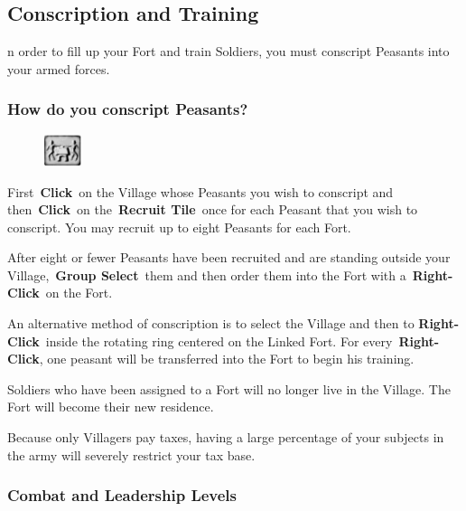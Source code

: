 \subsection{Conscription and Training}


n order to fill up your Fort and train Soldiers, you must conscript Peasants into your armed forces.

\subsubsection{How do you conscript Peasants?}

\begin{figure}
	\vspace{-20pt}
	\begin{center}
		\includegraphics[width=0.1\textwidth]{Trecruit}
	\end{center}
	\vspace{-20pt}
\end{figure}

First \textbf{Click} on the Village whose Peasants you wish to conscript and then \textbf{Click} on the \textbf{Recruit Tile} once for each Peasant that you wish to conscript. You may recruit up to eight Peasants for each Fort.

After eight or fewer Peasants have been recruited and are standing outside your Village, \textbf{Group Select} them and then order them into the Fort with a \textbf{Right-Click} on the Fort.

An alternative method of conscription is to select the Village and then to \textbf{Right-Click} inside the rotating ring centered on the Linked Fort. For every \textbf{Right-Click}, one peasant will be transferred into the Fort to begin his training.

Soldiers who have been assigned to a Fort will no longer live in the Village. The Fort will become their new residence.

Because only Villagers pay taxes, having a large percentage of your subjects in the army will severely restrict your tax base.

\subsubsection{Combat and Leadership Levels}

